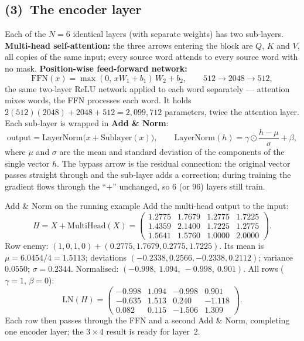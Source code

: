 \documentclass[11pt]{article}
\newcommand{\blk}[1]{\textbf{(#1)}}
\begin{document}
\subsection{\blk3\ The encoder layer}
Each of the $N=6$ identical layers (with separate weights) has two sub-layers. \textbf{Multi-head self-attention:} the three arrows entering the block are $Q$, $K$ and $V$, all copies of the same input; every source word attends to every source word with no mask. \textbf{Position-wise feed-forward network:}
\[\text{FFN}(x)=\max(0,\,xW_1+b_1)\,W_2+b_2,\qquad 512\to2048\to512,\]
the same two-layer ReLU network applied to each word separately --- attention mixes words, the FFN processes each word. It holds $2(512)(2048)+2048+512=2{,}099{,}712$ parameters, twice the attention layer. Each sub-layer is wrapped in \textbf{Add \& Norm}:
\[\text{output}=\text{LayerNorm}\big(x+\text{Sublayer}(x)\big),\qquad \text{LayerNorm}(h)=\gamma\odot\frac{h-\mu}{\sigma}+\beta,\]
where $\mu$ and $\sigma$ are the mean and standard deviation of the components of the single vector $h$. The bypass arrow is the residual connection: the original vector passes straight through and the sub-layer adds a correction; during training the gradient flows through the ``$+$'' unchanged, so 6 (or 96) layers still train.
\begin{example}{Add \& Norm on the running example}
Add the multi-head output to the input:
\[H=X+\text{MultiHead}(X)=\begin{pmatrix}1.2775&1.7679&1.2775&1.7225\\1.4359&2.1400&1.7225&1.2775\\1.5641&1.5760&1.0000&2.0000\end{pmatrix}.\]
Row enemy: $(1,0,1,0)+(0.2775,1.7679,0.2775,1.7225)$. Its mean is $\mu=6.0454/4=1.5113$; deviations $(-0.2338,0.2566,-0.2338,0.2112)$; variance $0.0550$; $\sigma=0.2344$. Normalised: $(-0.998,\ 1.094,\ -0.998,\ 0.901)$. All rows ($\gamma=1$, $\beta=0$):
\[\text{LN}(H)=\begin{pmatrix}-0.998&1.094&-0.998&0.901\\-0.635&1.513&0.240&-1.118\\0.082&0.115&-1.506&1.309\end{pmatrix}.\]
Each row then passes through the FFN and a second Add \& Norm, completing one encoder layer; the $3\times4$ result is ready for layer~2.
\end{example}
\end{document}
